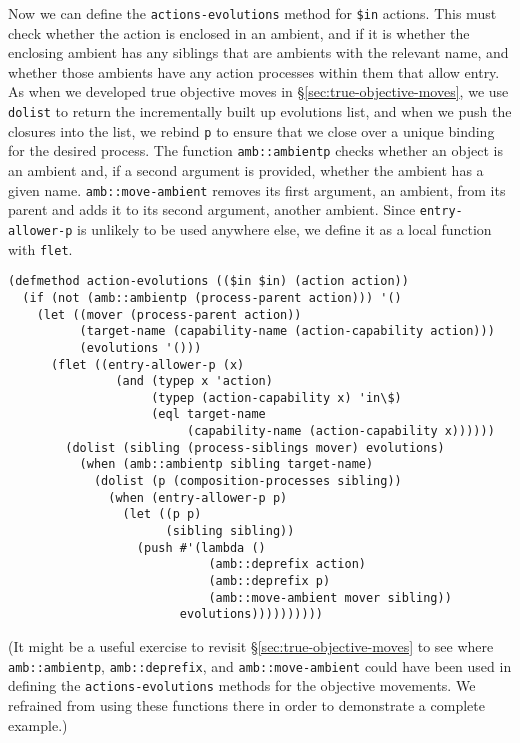 \documentclass[12pt]{article}
\begin{document}
Now we can define the \texttt{actions-evolutions} method for \texttt{\$in} actions.
This must check whether the action is enclosed in an ambient, and if it is whether the enclosing ambient has any siblings that are ambients with the relevant name, and whether those ambients have any action processes within them that allow entry.
As when we developed true objective moves in \S\ref{sec:true-objective-moves}, we use \texttt{dolist} to return the incrementally built up evolutions list, and when we push the closures into the list, we rebind \texttt{p} to ensure that we close over a unique binding for the desired process.
The function \texttt{amb::ambientp} checks whether an object is an ambient and, if a second argument is provided, whether the ambient has a given name.
\texttt{amb::move-ambient} removes its first argument, an ambient, from its parent and adds it to its second argument, another ambient.
Since \texttt{entry-allower-p} is unlikely to be used anywhere else, we define it as a local function with \texttt{flet}.

\begin{verbatim}
(defmethod action-evolutions (($in $in) (action action))
  (if (not (amb::ambientp (process-parent action))) '()
    (let ((mover (process-parent action))
          (target-name (capability-name (action-capability action)))
          (evolutions '()))
      (flet ((entry-allower-p (x)
               (and (typep x 'action)
                    (typep (action-capability x) 'in\$)
                    (eql target-name
                         (capability-name (action-capability x))))))
        (dolist (sibling (process-siblings mover) evolutions)
          (when (amb::ambientp sibling target-name)
            (dolist (p (composition-processes sibling))
              (when (entry-allower-p p)
                (let ((p p)
                      (sibling sibling))
                  (push #'(lambda ()
                            (amb::deprefix action)
                            (amb::deprefix p)
                            (amb::move-ambient mover sibling))
                        evolutions))))))))))
\end{verbatim}

(It might be a useful exercise to revisit \S\ref{sec:true-objective-moves} to see where \texttt{amb::ambientp}, \texttt{amb::deprefix}, and \texttt{amb::move-ambient} could have been used in defining the \texttt{actions-evolutions} methods for the objective movements.
We refrained from using these functions there in order to demonstrate a complete example.)
\end{document}
